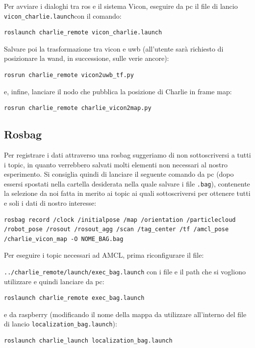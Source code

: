 Per avviare i dialoghi tra ros e il sistema Vicon, eseguire da pc il file di lancio \verb|vicon_charlie.launch|con il comando:
\begin{lstlisting}[style=bashPC]
	roslaunch charlie_remote vicon_charlie.launch
\end{lstlisting}

Salvare poi la trasformazione tra vicon e uwb (all'utente sarà richiesto di posizionare la wand, in successione, sulle verie ancore):
\begin{lstlisting}[style=bashPC]
	rosrun charlie_remote vicon2uwb_tf.py
\end{lstlisting}

e, infine, lanciare il nodo che pubblica la posizione di Charlie in frame map:
\begin{lstlisting}[style=bashPC]
	rosrun charlie_remote charlie_vicon2map.py
\end{lstlisting}


\subsection*{Rosbag}
Per registrare i dati attraverso una rosbag suggeriamo di non sottoscriversi a tutti i topic, in quanto verrebbero salvati molti elementi non necessari al nostro esperimento. Si consiglia quindi di lanciare il seguente comando da pc (dopo essersi spostati nella cartella desiderata nella quale salvare i file \verb|.bag|), contenente la selezione da noi fatta in merito ai topic ai quali sottoscriversi per ottenere tutti e soli i dati di nostro interesse:
\begin{lstlisting}[style=bashPC]
	rosbag record /clock /initialpose /map /orientation /particlecloud /robot_pose /rosout /rosout_agg /scan /tag_center /tf /amcl_pose /charlie_vicon_map -O NOME_BAG.bag
\end{lstlisting}

Per eseguire i topic necessari ad AMCL, prima riconfigurare il file:

\verb|../charlie_remote/launch/exec_bag.launch| con i file e il path che si vogliono utilizzare e quindi lanciare da pc:
\begin{lstlisting}[style=bashPC]
	roslaunch charlie_remote exec_bag.launch
\end{lstlisting}
e da raspberry (modificando il nome della mappa da utilizzare all'interno del file di lancio \verb|localization_bag.launch|):
\begin{lstlisting}[style=bash]
	roslaunch charlie_launch localization_bag.launch
\end{lstlisting}

